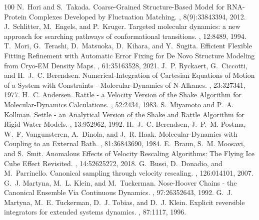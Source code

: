 \documentclass[a4paper,11pt,oneside,english]{sphinxmanual}
\begin{document}
\begin{sphinxthebibliography}{100}
N. Hori and S. Takada. Coarse-Grained Structure-Based Model for RNA-Protein Complexes Developed by Fluctuation Matching. , 8(9):3384\textendash{}3394, 2012.
J. Schlitter, M. Engels, and P. Kruger. Targeted molecular dynamics: a new approach for searching pathways of conformational transitions. , 12:84\textendash{}89, 1994.
T. Mori, G. Terashi, D. Matsuoka, D. Kihara, and Y. Sugita. Efficient Flexible Fitting Refinement with Automatic Error Fixing for De Novo Structure Modeling from Cryo-EM Density Maps. , 61:3516\textendash{}3528, 2021.
J. P. Ryckaert, G. Ciccotti, and H. J. C. Berendsen. Numerical-Integration of Cartesian Equations of Motion of a System with Constraints - Molecular-Dynamics of N-Alkanes. , 23:327\textendash{}341, 1977.
H. C. Andersen. Rattle - a Velocity Version of the Shake Algorithm for Molecular-Dynamics Calculations. , 52:24\textendash{}34, 1983.
S. Miyamoto and P. A. Kollman. Settle - an Analytical Version of the Shake and Rattle Algorithm for Rigid Water Models. , 13:952\textendash{}962, 1992.
H. J. C. Berendsen, J. P. M. Postma, W. F. Vangunsteren, A. Dinola, and J. R. Haak. Molecular-Dynamics with Coupling to an External Bath. , 81:3684\textendash{}3690, 1984.
E. Braun, S. M. Moosavi, and S. Smit. Anomalous Effects of Velocity Rescaling Algorithms: The Flying Ice Cube Effect Revisited. , 14:5262\textendash{}5272, 2018.
G. Bussi, D. Donadio, and M. Parrinello. Canonical sampling through velocity rescaling. , 126:014101, 2007.
G. J. Martyna, M. L. Klein, and M. Tuckerman. Nose-Hoover Chains - the Canonical Ensemble Via Continuous Dynamics. , 97:2635\textendash{}2643, 1992.
G. J. Martyna, M. E. Tuckerman, D. J. Tobias, and D. J. Klein. Explicit reversible integrators for extended systems dynamics. , 87:1117, 1996.

\end{sphinxthebibliography}
\end{document}
